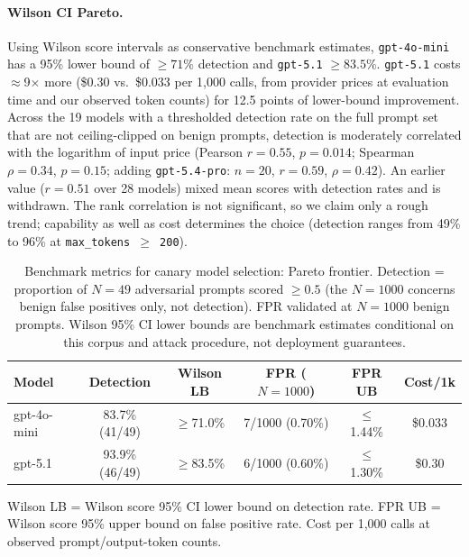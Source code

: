 \documentclass{article}
\begin{document}
\paragraph{Wilson CI Pareto.} Using Wilson score intervals as conservative benchmark estimates, \texttt{gpt-4o-mini} has a 95\% lower bound of $\geq 71\%$ detection and \texttt{gpt-5.1} $\geq 83.5\%$. \texttt{gpt-5.1} costs $\approx$9$\times$ more (\$0.30 vs.\ \$0.033 per 1{,}000 calls, from provider prices at evaluation time and our observed token counts) for 12.5 points of lower-bound improvement. Across the 19 models with a thresholded detection rate on the full prompt set that are not ceiling-clipped on benign prompts, detection is moderately correlated with the logarithm of input price (Pearson $r = 0.55$, $p = 0.014$; Spearman $\rho = 0.34$, $p = 0.15$; adding \texttt{gpt-5.4-pro}: $n = 20$, $r = 0.59$, $\rho = 0.42$). An earlier value ($r = 0.51$ over 28 models) mixed mean scores with detection rates and is withdrawn. The rank correlation is not significant, so we claim only a rough trend; capability as well as cost determines the choice (detection ranges from 49\% to 96\% at \texttt{max\_tokens $\geq$ 200}).

\begin{table}[h]
\centering
\small
\caption{Benchmark metrics for canary model selection: Pareto frontier. Detection = proportion of $N{=}49$ adversarial prompts scored $\geq 0.5$ (the $N{=}1000$ concerns benign false positives only, not detection). FPR validated at $N{=}1000$ benign prompts. Wilson 95\% CI lower bounds are benchmark estimates conditional on this corpus and attack procedure, not deployment guarantees.}
\label{tab:pareto-deployment}
\begin{tabular}{lccccc}
\toprule
\textbf{Model} & \textbf{Detection} & \textbf{Wilson LB} & \textbf{FPR ($N{=}1000$)} & \textbf{FPR UB} & \textbf{Cost/1k} \\
\midrule
gpt-4o-mini & 83.7\% (41/49) & $\geq$71.0\% & 7/1000 (0.70\%) & $\leq$1.44\% & \$0.033 \\
gpt-5.1 & 93.9\% (46/49) & $\geq$83.5\% & 6/1000 (0.60\%) & $\leq$1.30\% & \$0.30 \\
\bottomrule
\end{tabular}
\vspace{2pt}

{\footnotesize Wilson LB = Wilson score 95\% CI lower bound on detection rate. FPR UB = Wilson score 95\% upper bound on false positive rate. Cost per 1{,}000 calls at observed prompt/output-token counts.}
\end{table}
\end{document}
